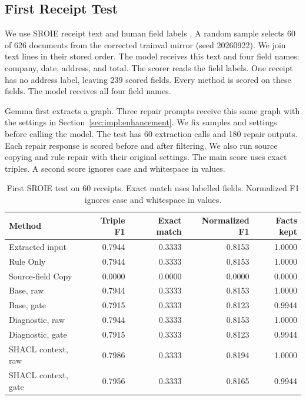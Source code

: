 \subsection{First Receipt Test}
\label{sec:eval:external_receipts}

We use SROIE receipt text and human field labels \citep{ref_sroie2019}.
A random sample selects 60 of 626 documents from the corrected trainval
mirror (seed 20260922). We join text lines in their stored order.
The model receives this text and four field names: company, date, address,
and total. The scorer reads the field labels.
One receipt has no address label, leaving 239 scored fields.
Every method is scored on these fields.
The model receives all four field names.

Gemma first extracts a graph. Three repair prompts receive this same graph
with the settings in Section~\ref{sec:impl:enhancement}.
We fix samples and settings before calling the model.
The test has 60 extraction calls and 180 repair outputs.
Each repair response is scored before and after filtering.
We also run source copying and rule repair with their original settings.
The main score uses exact triples. A second score ignores case and
whitespace in values.

\begin{table}[t]
\centering
\caption{First SROIE test on 60 receipts. Exact match uses labelled fields. Normalized F1 ignores case and whitespace in values.}
\label{tab:external_receipts}
\small
\begin{tabular}{lrrrr}
\toprule
Method & Triple F1 & Exact match & Normalized F1 & Facts kept \\
\midrule
Extracted input & 0.7944 & 0.3333 & 0.8153 & 1.0000 \\
Rule Only & 0.7944 & 0.3333 & 0.8153 & 1.0000 \\
Source-field Copy & 0.0000 & 0.0000 & 0.0000 & 0.0000 \\
Base, raw & 0.7944 & 0.3333 & 0.8153 & 1.0000 \\
Base, gate & 0.7915 & 0.3333 & 0.8123 & 0.9944 \\
Diagnostic, raw & 0.7944 & 0.3333 & 0.8153 & 1.0000 \\
Diagnostic, gate & 0.7915 & 0.3333 & 0.8123 & 0.9944 \\
SHACL context, raw & 0.7986 & 0.3333 & 0.8194 & 1.0000 \\
SHACL context, gate & 0.7956 & 0.3333 & 0.8165 & 0.9944 \\
\bottomrule
\end{tabular}
\end{table}

